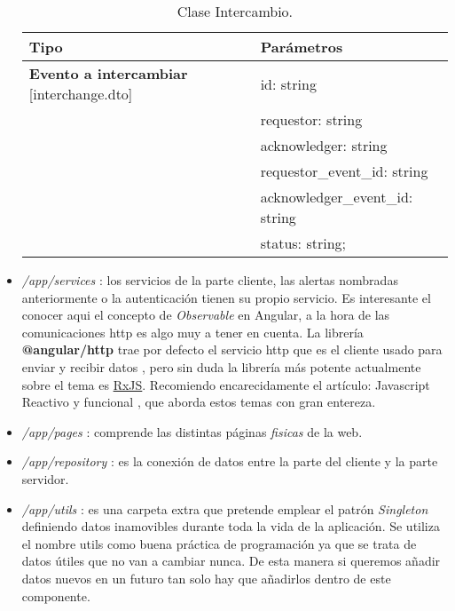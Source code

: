 \begin{itemize}
\begin{table}[H]
\centering
\begin{tabular}{|l|l|}
\hline
Tipo  & Parámetros  \\
\hline \hline
\textbf{Evento a intercambiar} [interchange.dto] & id: string \\ 
  & requestor: string \\ 
  & acknowledger: string \\ 
  & requestor\_event\_id: string \\ 
  & acknowledger\_event\_id: string \\ 
  & status: string;  \\ \hline
\end{tabular}
\caption{Clase Intercambio.}
\label{tabla:sencilla2}
\end{table}

	
	
	\item \emph{/app/services} : los servicios de la parte cliente, las alertas nombradas anteriormente o la autenticación tienen su propio servicio. Es interesante el conocer aqui el concepto de \emph{Observable} \cite{ob1} en Angular, a la hora de las comunicaciones http es algo muy a tener en cuenta. La librería \textbf{@angular/http} trae por defecto el servicio http que es el cliente usado para enviar y recibir datos \cite{ob2}, pero sin duda la librería más potente actualmente sobre el tema es \href{http://reactivex.io/rxjs/}{RxJS}. Recomiendo encarecidamente el artículo: Javascript Reactivo y funcional \cite{ob3}, que aborda estos temas con gran entereza.
	
	\item \emph{/app/pages} : comprende las distintas páginas \emph{fisicas} de la web.
	
	\item \emph{/app/repository} : es la conexión de datos entre la parte del cliente y la parte servidor.
	
	\item \emph{/app/utils} : es una carpeta extra que pretende emplear el patrón \emph{Singleton} definiendo datos inamovibles durante toda la vida de la aplicación. Se utiliza el nombre utils como buena práctica de programación ya que se trata de datos útiles que no van a cambiar nunca. De esta manera si queremos añadir datos nuevos en un futuro tan solo hay que añadirlos dentro de este componente. 
	

\end{itemize}
